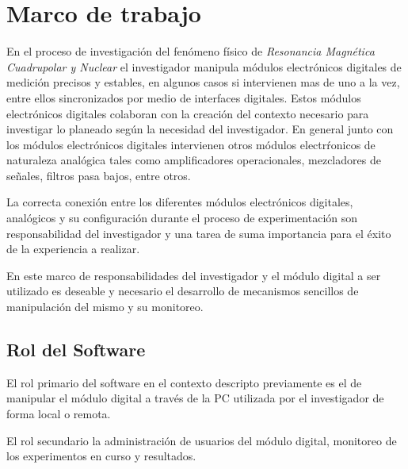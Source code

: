 \section{Marco de trabajo}

En el proceso de investigaci\'on del fen\'omeno f\'isico de \textit{Resonancia Magn\'etica Cuadrupolar y Nuclear} 
el investigador manipula m\'odulos electr\'onicos digitales de medici\'on precisos 
y estables, en algunos casos si intervienen mas de uno a la vez, entre ellos sincronizados 
por medio de interfaces digitales. 
Estos m\'odulos electr\'onicos digitales colaboran con la creaci\'on del contexto necesario 
para investigar lo planeado seg\'un la necesidad del investigador.
En general junto con los m\'odulos electr\'onicos digitales intervienen otros m\'odulos electr\'ronicos de 
naturaleza anal\'ogica tales como amplificadores operacionales, mezcladores de señales, 
filtros pasa bajos, entre otros.

La correcta conexi\'on entre los diferentes m\'odulos electr\'onicos digitales, anal\'ogicos y su configuraci\'on durante el proceso de experimentaci\'on son responsabilidad del investigador y una tarea de suma importancia para el \'exito de la experiencia a realizar.

En este marco de responsabilidades del investigador y el m\'odulo digital a ser utilizado es deseable 
y necesario el desarrollo de mecanismos sencillos de manipulaci\'on del mismo y su monitoreo.

\subsection{Rol del Software}

El rol primario del software en el contexto descripto previamente es el de manipular 
el m\'odulo digital a trav\'es de la PC utilizada por el investigador de forma local o remota.

El rol secundario la administraci\'on de usuarios del m\'odulo digital, monitoreo de los experimentos en curso y resultados.

\newpage

